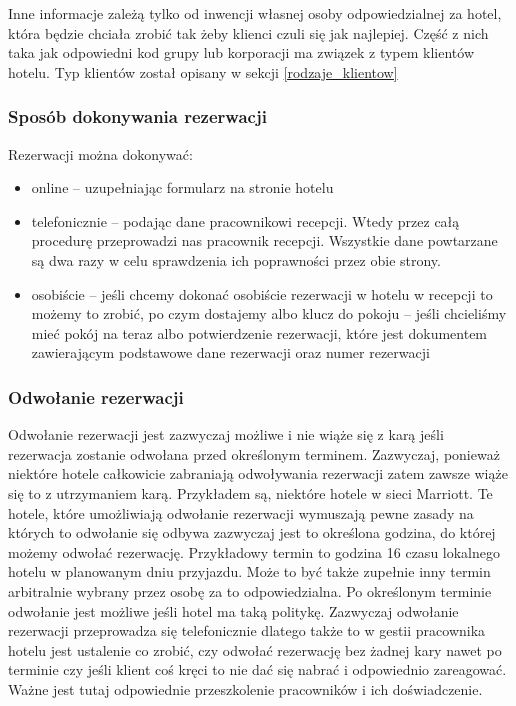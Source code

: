 \documentclass[a4paper,onecolumn,oneside,11pt,wide,floatssmall]{mwrep}
\theoremstyle{definition}
\theoremstyle{plain}%
\theoremstyle{remark}
\begin{document}
Inne informacje zależą tylko od inwencji własnej osoby odpowiedzialnej za hotel,
która będzie chciała zrobić tak żeby klienci czuli się jak najlepiej. Część z nich 
taka jak odpowiedni kod grupy lub korporacji ma związek z typem klientów hotelu.
Typ klientów został opisany w sekcji \ref{rodzaje_klientow}

\subsubsection{Sposób dokonywania rezerwacji}
Rezerwacji można dokonywać:
\begin{itemize}
  \item online – uzupełniając formularz na stronie hotelu
  \item telefonicznie – podając dane pracownikowi recepcji. Wtedy przez 
  całą procedurę przeprowadzi nas pracownik recepcji. Wszystkie dane powtarzane
  są dwa razy w celu sprawdzenia ich poprawności przez obie strony.
  \item osobiście – jeśli chcemy dokonać osobiście rezerwacji w hotelu w
  recepcji to możemy to zrobić, po czym dostajemy albo klucz do 
  pokoju – jeśli chcieliśmy mieć pokój na teraz albo potwierdzenie rezerwacji, 
  które jest dokumentem zawierającym podstawowe dane rezerwacji oraz 
  numer rezerwacji
\end{itemize}

\subsubsection{Odwołanie rezerwacji}
Odwołanie rezerwacji jest zazwyczaj możliwe i nie wiąże się z karą jeśli 
rezerwacja zostanie odwołana przed określonym terminem. Zazwyczaj, ponieważ
niektóre hotele całkowicie zabraniają odwoływania rezerwacji zatem zawsze wiąże
się to z utrzymaniem karą. Przykładem są, niektóre hotele w sieci Marriott.
Te hotele, które umożliwiają odwołanie rezerwacji wymuszają pewne
zasady na których to odwołanie się odbywa zazwyczaj jest to określona godzina,
do której możemy odwołać rezerwację. Przykładowy termin to godzina 16 czasu
lokalnego hotelu w planowanym dniu przyjazdu. Może to być także zupełnie inny termin arbitralnie wybrany przez osobę za to odpowiedzialna. 
  Po określonym terminie odwołanie jest możliwe jeśli hotel ma taką politykę. 
  Zazwyczaj odwołanie rezerwacji przeprowadza się telefonicznie dlatego także to w gestii 
  pracownika hotelu jest ustalenie co zrobić, czy odwołać rezerwację bez żadnej kary nawet po terminie
   czy jeśli klient coś kręci to nie dać się nabrać i odpowiednio zareagować. 
  Ważne jest tutaj odpowiednie przeszkolenie pracowników i ich doświadczenie.
  
\end{document}
